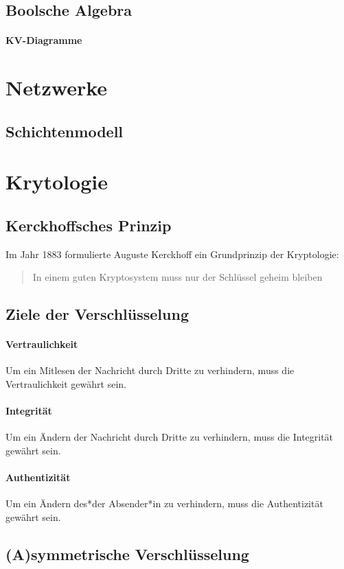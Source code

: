 \documentclass[10pt]{article}
\begin{document}
\subsection{Boolsche Algebra}
\paragraph{KV-Diagramme}

\section{Netzwerke}
\subsection{Schichtenmodell}

\section{Krytologie}
\subsection{Kerckhoffsches Prinzip}
Im Jahr 1883 formulierte Auguste Kerckhoff ein Grundprinzip der Kryptologie:
\begin{quote}
In einem guten Kryptosystem muss nur der Schlüssel geheim bleiben
\end{quote}
\subsection{Ziele der Verschlüsselung}
\paragraph{Vertraulichkeit}
Um ein Mitlesen der Nachricht durch Dritte zu verhindern, muss die Vertraulichkeit gewährt sein.
\paragraph{Integrität}
Um ein Ändern der Nachricht durch Dritte zu verhindern, muss die Integrität gewährt sein.
\paragraph{Authentizität}
Um ein Ändern des*der Absender*in zu verhindern, muss die Authentizität gewährt sein.
\subsection{(A)symmetrische Verschlüsselung}
\end{document}
